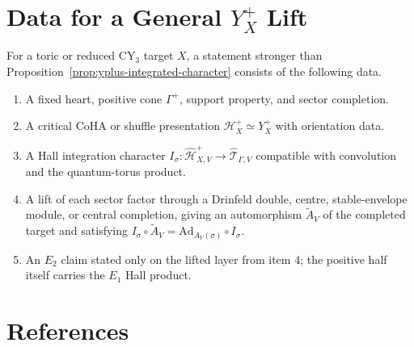 \documentclass[11pt]{article}
\theoremstyle{definition}
\providecommand{\cH}{\mathcal{H}}
\providecommand{\cT}{\mathcal{T}}
\providecommand{\Yplus}{Y^{+}}
\providecommand{\Ad}{\mathrm{Ad}}
\begin{document}
\section{Data for a General \texorpdfstring{$Y_X^+$}{Y+X} Lift}

For a toric or reduced CY$_3$ target $X$, a statement stronger than
Proposition~\ref{prop:yplus-integrated-character} consists of the
following data.

\begin{enumerate}
\item A fixed heart, positive cone $\Gamma^+$, support property, and
sector completion.
\item A critical CoHA or shuffle presentation
$\cH_X^+\simeq\Yplus_X$ with orientation data.
\item A Hall integration character
$I_\sigma:\widehat{\cH}_{X,V}^+\to\widehat{\cT}_{\Gamma,V}$ compatible
with convolution and the quantum-torus product.
\item A lift of each sector factor through a Drinfeld double, centre,
stable-envelope module, or central completion, giving an automorphism
$\widetilde A_V$ of the completed target and satisfying
$I_\sigma\circ\widetilde A_V=\Ad_{A_V(\sigma)}\circ I_\sigma$.
\item An $E_2$ claim stated only on the lifted layer from item 4; the
positive half itself carries the $E_1$ Hall product.
\end{enumerate}

\section*{References}
\end{document}
